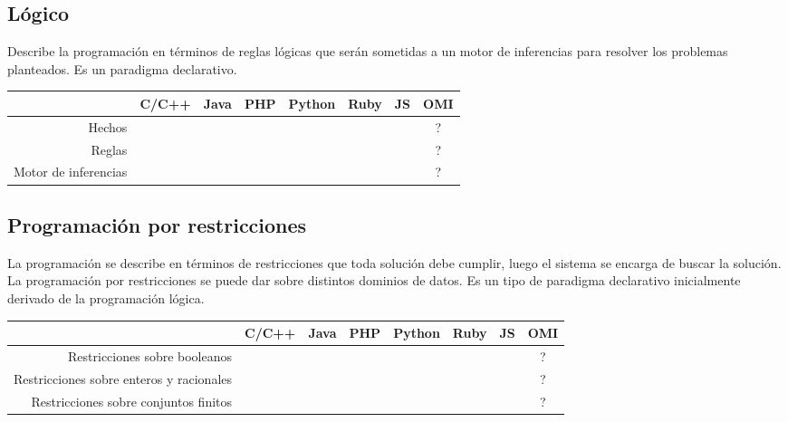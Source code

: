\subsection{Lógico}
Describe la programación en términos de reglas lógicas  que serán sometidas
a un motor de inferencias para resolver los problemas planteados. 
Es un paradigma declarativo. 

\FloatBarrier
\begin{table}[h]
\begin{center}
 
\begin{tabular}{|r|c|c|c|c|c|c|c|} \hline
 & C/C++ & Java & PHP  & Python & Ruby & JS & OMI\\ \hline
Hechos & & & & & & & ? \\ \hline
Reglas & & & & & & & ? \\ \hline
Motor de inferencias & & & & & & & ? \\ \hline
\end{tabular}
\end{center}
\end{table}
\FloatBarrier

\subsection{Programación por restricciones}
La programación se describe en términos de restricciones que toda solución debe cumplir, luego el
sistema se encarga de buscar la solución. La programación por restricciones se puede dar sobre distintos
dominios de datos. Es un tipo de paradigma declarativo inicialmente derivado de la programación lógica.

\FloatBarrier
\begin{table}[h]
\begin{center}
 
\begin{tabular}{|r|c|c|c|c|c|c|c|} \hline
 & C/C++ & Java & PHP  & Python & Ruby & JS & OMI\\ \hline
Restricciones sobre booleanos& & & & & & & ? \\ \hline
Restricciones sobre enteros y racionales& & & & & & & ? \\ \hline
Restricciones sobre conjuntos finitos & & & & & & & ? \\ \hline
\end{tabular}
\end{center}
\end{table}
\FloatBarrier


